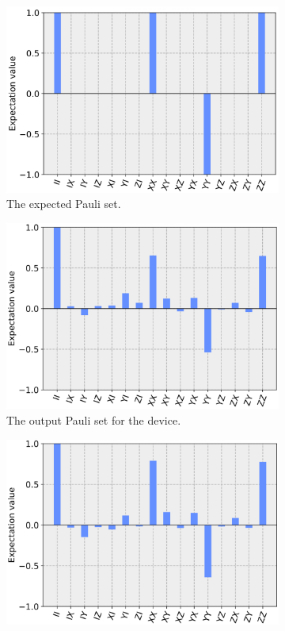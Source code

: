 \begin{figure}[h!]
	\begin{subfigure}{.5\textwidth} \centering %
		\includegraphics[width=.8\linewidth]{images/results/swap_pauli_sim.png}
		\caption{The expected Pauli set.}
		\label{fig:swap_pauli_sim}
	\end{subfigure} \newline
	\begin{subfigure}{.5\textwidth} \centering %
		\includegraphics[width=.8\linewidth]{images/results/swap_pauli_dev.png}
		\caption{The output Pauli set for the device.}
		\label{fig:swap_pauli_dev}
	\end{subfigure} \newline
	\begin{subfigure}{.5\textwidth} \centering %
		\includegraphics[width=.8\linewidth]{images/results/swap_pauli_cal.png}

\end{subfigure}
\end{figure}
